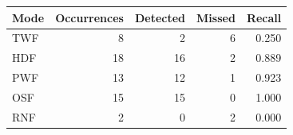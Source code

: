 \begin{tabular}{lrrrr}
\toprule
Mode & Occurrences & Detected & Missed & Recall\\
\midrule
TWF & 8 & 2 & 6 & 0.250\\
HDF & 18 & 16 & 2 & 0.889\\
PWF & 13 & 12 & 1 & 0.923\\
OSF & 15 & 15 & 0 & 1.000\\
RNF & 2 & 0 & 2 & 0.000\\
\bottomrule
\end{tabular}

